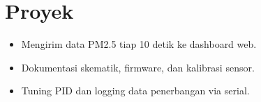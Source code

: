 \section{Proyek}
\begin{itemize}
  \item Mengirim data PM2.5 tiap 10 detik ke dashboard web.
  \item Dokumentasi skematik, firmware, dan kalibrasi sensor.
\end{itemize}
\begin{itemize}
  \item Tuning PID dan logging data penerbangan via serial.
\end{itemize}
